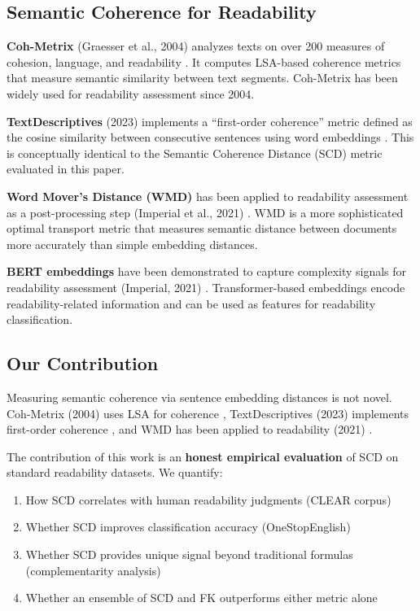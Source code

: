 \documentclass[11pt,letterpaper]{article}
\begin{document}
\subsection{Semantic Coherence for Readability}

\textbf{Coh-Metrix} (Graesser et al., 2004) analyzes texts on over 200 measures of cohesion, language, and readability \cite{Graesser2011}. It computes LSA-based coherence metrics that measure semantic similarity between text segments. Coh-Metrix has been widely used for readability assessment since 2004.

\textbf{TextDescriptives} (2023) implements a ``first-order coherence'' metric defined as the cosine similarity between consecutive sentences using word embeddings \cite{Hlasse2023}. This is conceptually identical to the Semantic Coherence Distance (SCD) metric evaluated in this paper.

\textbf{Word Mover's Distance (WMD)} has been applied to readability assessment as a post-processing step (Imperial et al., 2021) \cite{Imperial2021WMD}. WMD is a more sophisticated optimal transport metric that measures semantic distance between documents more accurately than simple embedding distances.

\textbf{BERT embeddings} have been demonstrated to capture complexity signals for readability assessment (Imperial, 2021) \cite{Imperial2021BERT}. Transformer-based embeddings encode readability-related information and can be used as features for readability classification.

\subsection{Our Contribution}

Measuring semantic coherence via sentence embedding distances is not novel. Coh-Metrix (2004) uses LSA for coherence \cite{Graesser2011}, TextDescriptives (2023) implements first-order coherence \cite{Hlasse2023}, and WMD has been applied to readability (2021) \cite{Imperial2021WMD}.

The contribution of this work is an \textbf{honest empirical evaluation} of SCD on standard readability datasets. We quantify:
\begin{enumerate}
  \item How SCD correlates with human readability judgments (CLEAR corpus)
  \item Whether SCD improves classification accuracy (OneStopEnglish)
  \item Whether SCD provides unique signal beyond traditional formulas (complementarity analysis)
  \item Whether an ensemble of SCD and FK outperforms either metric alone
\end{enumerate}
\end{document}
